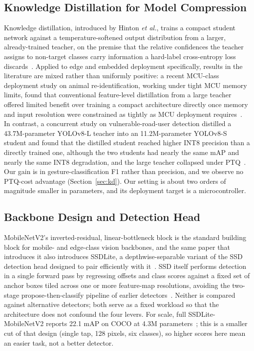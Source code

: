 \documentclass[conference]{IEEEtran}
\begin{document}
	\subsection{Knowledge Distillation for Model Compression}
	
	Knowledge distillation, introduced by Hinton \textit{et al.}, trains a compact student network
	against a temperature-softened output distribution from a larger, already-trained teacher, on
	the premise that the relative confidences the teacher assigns to non-target classes carry
	information a hard-label cross-entropy loss discards~\cite{hinton2015distilling}. Applied to
	edge and embedded deployment specifically, results in the literature are mixed rather than
	uniformly positive: a recent MCU-class deployment study on animal re-identification, working
	under tight MCU memory limits, found that conventional feature-level distillation from a
	large teacher offered limited benefit over training a compact architecture directly once
	memory and input resolution were constrained as tightly as MCU deployment
	requires~\cite{chen2025animalreid}. In contrast, a concurrent study on vulnerable-road-user
	detection distilled a 43.7M-parameter YOLOv8-L
	teacher into an 11.2M-parameter YOLOv8-S student and found that the distilled student
	reached higher INT8 precision than a directly trained one, although the two students had nearly the same mAP and nearly the same INT8 degradation, and the large teacher collapsed under PTQ~\cite{karjol2026edgekd}. Our gain is in gesture-classification F1 rather than precision, and we observe no PTQ-cost advantage (Section~\ref{sec:kd}). Our setting is about two orders of magnitude smaller in parameters, and its deployment target is a microcontroller.
	
	\subsection{Backbone Design and Detection Head}
	
	MobileNetV2's inverted-residual, linear-bottleneck block is the standard building block for
	mobile- and edge-class vision backbones, and the same paper that introduces it also introduces
	SSDLite, a depthwise-separable variant of the SSD detection head designed to pair
	efficiently with it~\cite{sandler2018mobilenetv2}. SSD itself performs detection in a single
	forward pass by regressing offsets and class scores against a fixed set of anchor boxes tiled
	across one or more feature-map resolutions, avoiding the two-stage
	propose-then-classify pipeline of earlier detectors~\cite{liu2016ssd}. Neither is compared
	against alternative detectors; both serve as a fixed workload so that the architecture does
	not confound the four levers. For scale, full SSDLite-MobileNetV2 reports 22.1 mAP on COCO at 4.3M parameters~\cite{sandler2018mobilenetv2}; this is a smaller cut of that design (single tap, 128 pixels, six classes), so higher scores here mean an easier task, not a better detector.
	
\end{document}

